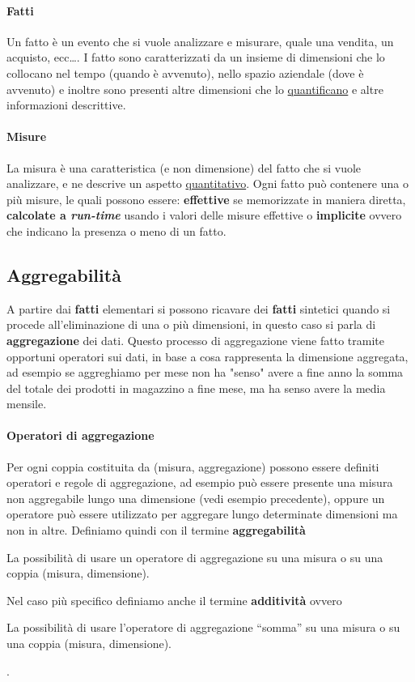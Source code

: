         \paragraph{Fatti} Un fatto è un evento che si vuole analizzare e misurare, quale una vendita, un acquisto, ecc\dots. I fatto sono caratterizzati da un insieme di dimensioni che lo collocano nel tempo (quando è avvenuto), nello spazio aziendale (dove è avvenuto) e inoltre sono presenti altre dimensioni che lo \underline{quantificano} e altre informazioni descrittive. 
        \paragraph{Misure} La misura è una caratteristica (e non dimensione) del fatto che si vuole analizzare, e ne descrive un aspetto \underline{quantitativo}. Ogni fatto può contenere una o più misure, le quali possono essere: \textbf{effettive} se memorizzate in maniera diretta, \textbf{calcolate a \textit{run-time}} usando i valori delle misure effettive o \textbf{implicite} ovvero che indicano la presenza o meno di un fatto.
    \subsection{Aggregabilità} 
        A partire dai \textbf{fatti} elementari si possono ricavare dei \textbf{fatti} sintetici quando si procede all'eliminazione di una o più dimensioni, in questo caso si parla di \textbf{aggregazione} dei dati. Questo processo di aggregazione viene fatto tramite opportuni operatori sui dati, in base a cosa rappresenta la dimensione aggregata, ad esempio se aggreghiamo per mese non ha "senso" avere a fine anno la somma del totale dei prodotti in magazzino a fine mese, ma ha senso avere la media mensile.
        \paragraph{Operatori di aggregazione} Per ogni coppia costituita da (misura, aggregazione) possono essere definiti operatori e regole di aggregazione, ad esempio può essere presente una misura non aggregabile lungo una dimensione (vedi esempio precedente), oppure un operatore può essere utilizzato per aggregare lungo determinate dimensioni ma non in altre. Definiamo quindi con il termine \textbf{aggregabilità} \begin{definition}[Aggregabilità]
            La possibilità di usare un operatore di aggregazione su una misura o su una coppia (misura, dimensione).
        \end{definition}
        Nel caso più specifico definiamo anche il termine \textbf{additività} ovvero \begin{definition}[Additività]
            La possibilità di usare l'operatore di aggregazione ``somma'' su una misura o su una coppia (misura, dimensione).
        \end{definition}.
